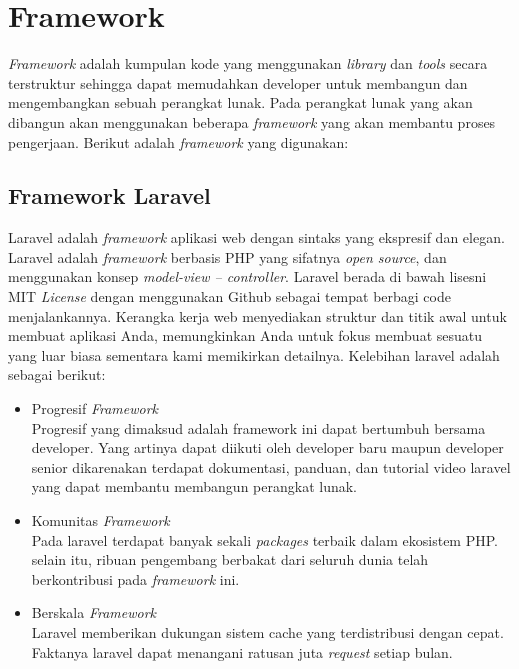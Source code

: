 \section{Framework}
\label{sec:framework}
\textit{Framework} adalah kumpulan kode yang menggunakan \textit{library} dan \textit{tools} secara terstruktur sehingga dapat memudahkan developer untuk membangun dan mengembangkan sebuah perangkat lunak. Pada perangkat lunak yang akan dibangun akan menggunakan beberapa \textit{framework} yang akan membantu proses pengerjaan. Berikut adalah \textit{framework} yang digunakan:

\subsection{Framework Laravel}
Laravel adalah \textit{framework} aplikasi web dengan sintaks yang ekspresif dan elegan. Laravel adalah \textit{framework} berbasis PHP yang sifatnya \textit{open source}, dan menggunakan konsep \textit{model-view – controller}. Laravel berada di bawah lisesni MIT \textit{License} dengan menggunakan Github sebagai tempat berbagi code menjalankannya. Kerangka kerja web menyediakan struktur dan titik awal untuk membuat aplikasi Anda, memungkinkan Anda untuk fokus membuat sesuatu yang luar biasa sementara kami memikirkan detailnya. Kelebihan laravel adalah sebagai berikut:

\begin{itemize}
	\item Progresif \textit{Framework} \\
	Progresif yang dimaksud adalah framework ini dapat bertumbuh bersama developer. Yang artinya dapat diikuti oleh developer baru maupun developer senior dikarenakan terdapat dokumentasi, panduan, dan tutorial video laravel yang dapat membantu membangun perangkat lunak.
	\item Komunitas \textit{Framework} \\
	Pada laravel terdapat banyak sekali \textit{packages} terbaik dalam ekosistem PHP. selain itu, ribuan pengembang berbakat dari seluruh dunia telah berkontribusi pada \textit{framework} ini.
	\item Berskala \textit{Framework} \\
	Laravel memberikan dukungan sistem cache yang terdistribusi dengan cepat. Faktanya laravel dapat menangani ratusan juta \textit{request} setiap bulan.
\end{itemize}

